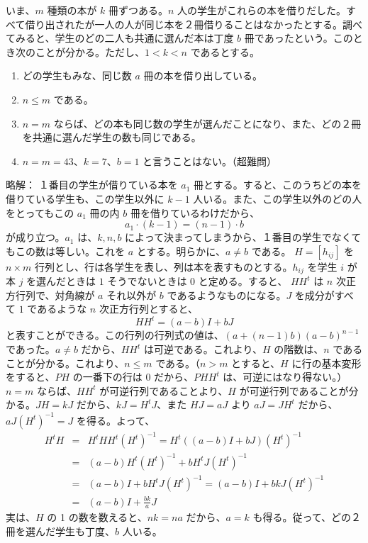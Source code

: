 いま、$m$ 種類の本が $k$ 冊ずつある。$n$ 人の学生がこれらの本を借りだした。すべて借り出されたが一人の人が同じ本を２冊借りることはなかったとする。調べてみると、学生のどの二人も共通に選んだ本は丁度 $b$ 冊であったという。このとき次のことが分かる。ただし、$1<k<n$ であるとする。
\begin{enumerate}
\item どの学生もみな、同じ数 $a$ 冊の本を借り出している。
\item $n\leq m$ である。
\item $n = m$ ならば、どの本も同じ数の学生が選んだことになり、また、どの２冊を共通に選んだ学生の数も同じである。
\item $n = m = 43$、$k = 7$、$b =1$ と言うことはない。（超難問）
\end{enumerate}
{\gt 略解：}\quad
１番目の学生が借りている本を $a_1$ 冊とする。すると、このうちどの本を借りている学生も、この学生以外に $k-1$ 人いる。また、この学生以外のどの人をとってもこの $a_1$ 冊の内 $b$ 冊を借りているわけだから、
$$a_1\cdot (k - 1) = (n-1)\cdot b$$
が成り立つ。$a_1$ は、$k, n, b$ によって決まってしまうから、１番目の学生でなくてもこの数は等しい。これを $a$ とする。明らかに、$a\neq b$ である。
$H = [h_{ij}]$ を $n\times m$ 行列とし、行は各学生を表し、列は本を表すものとする。$h_{ij}$ を学生 $i$ が本 $j$ を選んだときは $1$ そうでないときは $0$ と定める。すると、
$HH^t$ は $n$ 次正方行列で、対角線が $a$ それ以外が $b$ であるようなものになる。$J$ を成分がすべて $1$ であるような $n$ 次正方行列とすると、
$$HH^t = (a-b)I + bJ$$
と表すことができる。この行列の行列式の値は、$(a+(n-1)b)(a-b)^{n-1}$ であった。$a\neq b$ だから、$HH^t$ は可逆である。これより、$H$ の階数は、$n$ であることが分かる。これより、$n\leq m$ である。（$n>m$ とすると、$H$ に行の基本変形をすると、$PH$ の一番下の行は 0 だから、$PHH^t$ は、可逆にはなり得ない。）$n = m$ ならば、$HH^t$ が可逆行列であることより、$H$ が可逆行列であることが分かる。$JH = kJ$ だから、$kJ = H^tJ$、また $HJ = aJ$ より $aJ = JH^t$ だから、$aJ(H^t)^{-1} = J$ を得る。よって、
\begin{eqnarray*}
H^tH & = & H^tHH^t(H^t)^{-1} = H^t((a-b)I + bJ)(H^t)^{-1}\\
& = & (a-b)H^t(H^t)^{-1} + bH^tJ(H^t)^{-1} \\
& =  & (a-b)I + bH^tJ(H^t)^{-1} = (a-b)I + bkJ(H^t)^{-1}\\
& = & (a-b)I + \frac{bk}{a}J
\end{eqnarray*}
実は、$H$ の 1 の数を数えると、$nk = na$ だから、$a = k$ も得る。従って、どの２冊を選んだ学生も丁度、$b$ 人いる。

